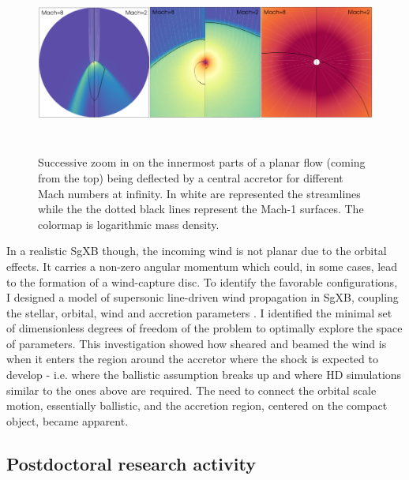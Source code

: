 \documentclass[a4paper,12pt,onecolumn]{article}
\newcommand{\sgx}{SgXB\xspace}
\begin{document}
\begin{figure}[!b]
\begin{center}
\hspace*{-0.8cm}
\includegraphics[height=6cm, width=17cm]{Figures/zoom_BHL.png}	
\caption{Successive zoom in on the innermost parts of a planar flow (coming from the top) being deflected by a central accretor for different Mach numbers at infinity. In white are represented the streamlines while the the dotted black lines represent the Mach-1 surfaces. The colormap is logarithmic mass density.}
\label{fig:zoom_BHL}
\end{center}
\end{figure}
\indent In a realistic \sgx though, the incoming wind is not planar due to the orbital effects. It carries a non-zero angular momentum which could, in some cases, lead to the formation of a wind-capture disc. To identify the favorable configurations, I designed a model of supersonic line-driven wind propagation in \sgx, coupling the stellar, orbital, wind and accretion parameters \citep{ElMellah2016a}. I identified the minimal set of dimensionless degrees of freedom of the problem to optimally explore the space of parameters. This investigation showed how sheared and beamed the wind is when it enters the region around the accretor where the shock is expected to develop - i.e. where the ballistic assumption breaks up and where HD simulations similar to the ones above are required. The need to connect the orbital scale motion, essentially ballistic, and the accretion region, centered on the compact object, became apparent.\\



\subsection*{Postdoctoral research activity}
\end{document}
